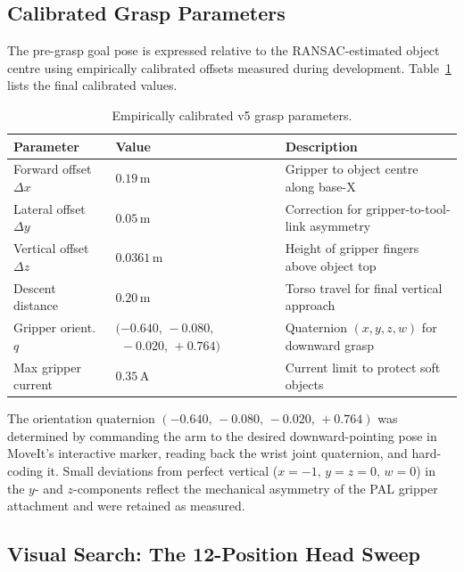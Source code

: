 \subsection{Calibrated Grasp Parameters}

The pre-grasp goal pose is expressed relative to the RANSAC-estimated object
centre using empirically calibrated offsets measured during development.
Table~\ref{tab:grasp_params} lists the final calibrated values.

\begin{table}[H]
\centering
\caption{Empirically calibrated v5 grasp parameters.}
\label{tab:grasp_params}
\small
\begin{tabularx}{\linewidth}{l p{3.8cm} X}
\toprule
\textbf{Parameter} & \textbf{Value} & \textbf{Description} \\
\midrule
Forward offset $\Delta x$    & $0.19$\,m    & Gripper to object centre along base-X \\
Lateral offset $\Delta y$    & $0.05$\,m    & Correction for gripper-to-tool-link asymmetry \\
Vertical offset $\Delta z$   & $0.0361$\,m  & Height of gripper fingers above object top \\
Descent distance             & $0.20$\,m    & Torso travel for final vertical approach \\
Gripper orient.\ $q$         & $(-0.640,\,-0.080,$\newline$\phantom{(}-0.020,\,+0.764)$ & Quaternion $(x,y,z,w)$ for downward grasp \\
Max gripper current          & $0.35$\,A    & Current limit to protect soft objects \\
\bottomrule
\end{tabularx}
\normalsize
\end{table}

The orientation quaternion $(-0.640,\,-0.080,\,-0.020,\,+0.764)$ was determined
by commanding the arm to the desired downward-pointing pose in MoveIt's
interactive marker, reading back the wrist joint quaternion, and hard-coding it.
Small deviations from perfect vertical ($x=-1,\,y=z=0,\,w=0$) in the
$y$- and $z$-components reflect the mechanical asymmetry of the PAL gripper
attachment and were retained as measured.

\subsection{Visual Search: The 12-Position Head Sweep}

